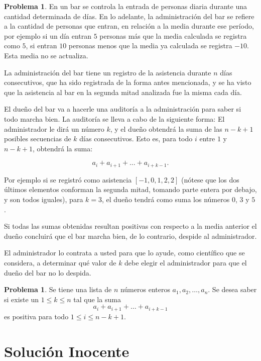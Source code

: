 \documentclass[10pt]{amsart}
\theoremstyle{definition}
\newtheorem{prob}[theorem]{Problema}
\numberwithin{equation}{section}
\begin{document}
	\begin{prob}
		
		En un bar se controla la entrada de personas diaria durante una cantidad determinada de días. En lo adelante, la administración del bar se refiere a la cantidad de personas que entran, en relación a la media durante ese período, por ejemplo si un día entran $5$ personas más que la media calculada se registra como $5$, si entran $10$ personas menos que la media ya calculada se registra $-10$. Esta media no se actualiza. 
		
		La administración del bar tiene un registro de la asistencia durante $n$ días consecutivos, que ha sido registrada de la forma antes mencionada, y se ha visto que la asistencia al bar en la segunda mitad analizada fue la misma cada día.
		
		El dueño del bar va a hacerle una auditoría a la administración para saber si todo marcha bien. La auditor\'ia se lleva a cabo de la siguiente forma: El administrador le dirá un número $k$, y el dueño 
		obtendr\'a la suma de las $n - k + 1$ posibles secuencias de $k$ d\'ias consecutivos. Esto es, para todo $i$ entre $1$ y $n - k + 1$, obtendr\'a la suma:
		
		$$a_i + a_{i+1} + ... + a_{i+k-1}. $$
		
		Por ejemplo si se registr\'o como asistencia $[-1, 0, 1, 2, 2]$ (n\'otese que los dos \'ultimos elementos conforman la segunda mitad, tomando parte entera por debajo, y son todos iguales), para $k = 3$, el dueño tendrá como suma los números $0$, $3$ y $5$.
		
		Si todas las sumas obtenidas resultan positivas con respecto a la media anterior el dueño concluir\'a que el bar marcha bien, de lo contrario, despide al administrador.
		
		El administrador lo contrata a usted para que lo ayude, como científico que se considera, a determinar qu\'e  valor de $k$ debe elegir el administrador para que el due\~no del bar no lo despida.
	\end{prob}

	\begin{prob}
		Se tiene una lista de $n$ n\'umeros enteros $a_1, a_2, \dots, a_n$. Se desea saber si existe un $1 \le k \le n$ tal que la suma
		\[ a_i + a_{i + 1} + \dots + a_{i + k - 1}\]
		es positiva para todo $1\le i\le n - k + 1$.
	\end{prob}

	\section{Soluci\'on Inocente}
\end{document}
